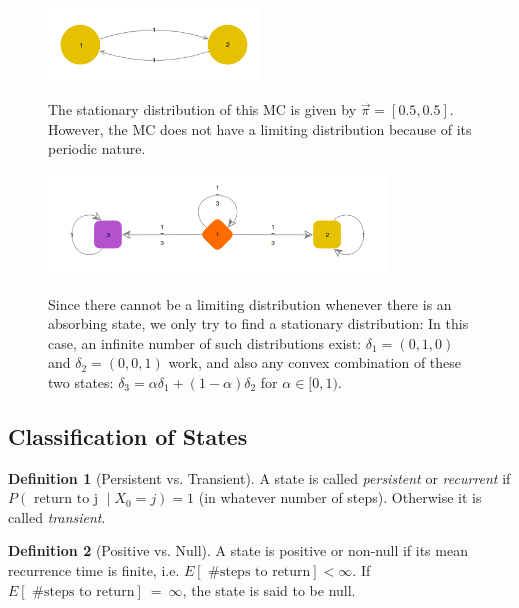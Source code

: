 \documentclass{article}
\theoremstyle{definition}
\newtheorem{defn}{Definition}[section]
\begin{document}
\begin{figure}[h!]
\centering
\includegraphics[width=0.5\textwidth]{images/exmc2}
\label{fig:exmc2}
\caption{ The stationary distribution of this MC is given by $\vec \pi = [0.5, 0.5]$. However, the MC does not have a limiting distribution because of its periodic nature.}
\end{figure}

\begin{figure}[h!]
\centering
\includegraphics[width=0.8\textwidth]{images/exmc3}
\label{fig:exmc3}
\caption{Since there cannot be a limiting distribution whenever there is an absorbing state, we only try to find a stationary distribution: In this case, an infinite number of such distributions exist: $\delta_1 = (0,1,0)$ and $\delta_2 = (0,0,1)$ work, and also any convex combination of these two states: $\delta_3 = \alpha \delta_1 + (1-\alpha) \delta_2$ for $\alpha \in [0,1)$.}
\end{figure}


\subsection{Classification of States}

\begin{defn}[Persistent vs. Transient]
A state is called \emph{persistent} or \emph{recurrent} if $P( \text{ return to j } \mid X_0 = j) = 1$ (in whatever number of steps). Otherwise it is called \emph{transient}.
\end{defn}

\begin{defn}[Positive vs. Null]
A state is positive or non-null if its mean recurrence time is finite, i.e. 
$E\left[ \text{ \# steps to return} \right] < \infty$. If $E\left[ \text{ \# steps to return} \right]~=~\infty$, the state is said to be null.
\end{defn}
\end{document}
